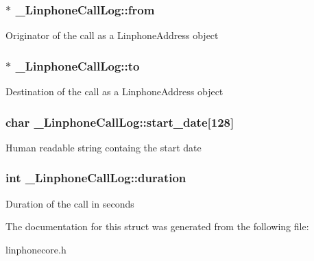 \subsubsection[{from}]{$\ast$ {\bf \-\_\-\-Linphone\-Call\-Log\-::from}}\label{struct__LinphoneCallLog_ae3d363a34177db87f304b7b3f255f701}
\-Originator of the call as a \-Linphone\-Address object 
\subsubsection[{to}]{$\ast$ {\bf \-\_\-\-Linphone\-Call\-Log\-::to}}\label{struct__LinphoneCallLog_ac2da59dead284f65174214f2e00209b3}
\-Destination of the call as a \-Linphone\-Address object 
\subsubsection[{start\-\_\-date}]{\setlength{\rightskip}{0pt plus 5cm}char {\bf \-\_\-\-Linphone\-Call\-Log\-::start\-\_\-date}[128]}\label{struct__LinphoneCallLog_a92b1a5b4900068fd6ee7fc9afccc4777}
\-Human readable string containg the start date 
\subsubsection[{duration}]{\setlength{\rightskip}{0pt plus 5cm}int {\bf \-\_\-\-Linphone\-Call\-Log\-::duration}}\label{struct__LinphoneCallLog_a5773a72ec719085a68a6092c46540592}
\-Duration of the call in seconds 

\-The documentation for this struct was generated from the following file\-:\begin{DoxyCompactItemize}
\item 
linphonecore.\-h\end{DoxyCompactItemize}
